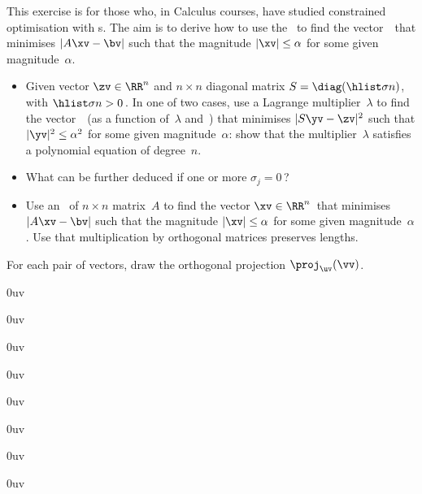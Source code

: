 \begin{exercise} \label{ex:} 
This exercise is for those who, in Calculus courses, have studied constrained optimisation with s. 
The aim is to derive how to use the \svd\ to find the vector~\xv\ that minimises \(|A\xv-\bv|\) such that the magnitude \(|\xv|\leq\alpha\) for some given magnitude~\(\alpha\).
\begin{itemize}
\item Given vector \(\zv\in\RR^n\) and \(n\times n\) diagonal matrix \(S=\diag(\hlist\sigma n)\), with \(\hlist\sigma n>0\)\,.
In one of two cases, use a Lagrange multiplier~\(\lambda\) to find the vector~\yv\ (as a function of~\(\lambda\) and~\zv) that minimises \(|S\yv-\zv|^2\) such that \(|\yv|^2\leq\alpha^2\) for some given magnitude~\(\alpha\): show that the multiplier~\(\lambda\) satisfies a polynomial equation of degree~\(n\).

\item What can be further deduced if one or more \(\sigma_j=0\)\,?

\item Use an \svd\ of \(n\times n\) matrix~\(A\) to find the vector \(\xv\in\RR^n\)\ that minimises \(|A\xv-\bv|\) such that the magnitude \(|\xv|\leq\alpha\) for some given magnitude~\(\alpha\).
Use that multiplication by orthogonal matrices preserves lengths.
\end{itemize}
\end{exercise}






\begin{exercise} \label{ex:} 
For each pair of vectors, draw the orthogonal projection \(\proj_\uv(\vv)\).
\begin{parts}
\item {}0uv
\item {}0uv
\item {}0uv
\item {}0uv
\item {}0uv
\item {}0uv
\item {}0uv
\item {}0uv
\end{parts}
\end{exercise}




